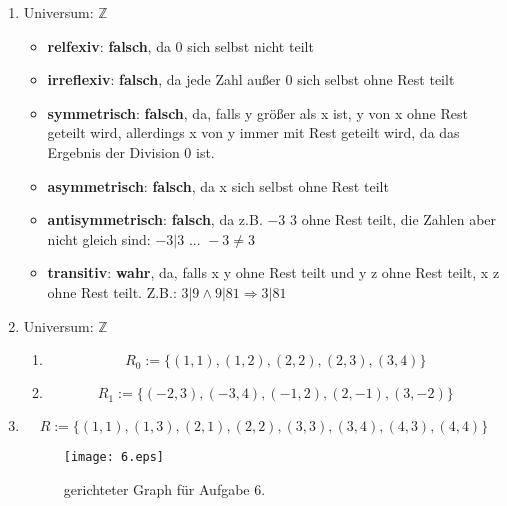 \documentclass[a4paper]{article}
\begin{document}
\begin{enumerate}
		\item
		Universum: $\mathbb{Z}$
		\begin{itemize}
			\item \textbf{relfexiv}: \textbf{falsch}, da 0 sich selbst nicht teilt
			\item \textbf{irreflexiv}: \textbf{falsch}, da jede Zahl außer 0 sich selbst ohne Rest teilt
			\item \textbf{symmetrisch}: \textbf{falsch}, da, falls y größer als x ist, y von x ohne Rest geteilt wird, allerdings x von y immer mit Rest geteilt wird, da das Ergebnis der Division 0 ist.
			\item \textbf{asymmetrisch}: \textbf{falsch}, da x sich selbst ohne Rest teilt
			\item \textbf{antisymmetrisch}: \textbf{falsch}, da z.B. $-3$ 3 ohne Rest teilt, die Zahlen aber nicht gleich sind: $-3 | 3 \text{ ... } -3 \neq 3$
			\item \textbf{transitiv}: \textbf{wahr}, da, falls x y ohne Rest teilt und y z ohne Rest teilt, x z ohne Rest teilt. Z.B.: $3 | 9 \land 9 | 81 \Rightarrow 3 | 81$
		\end{itemize}
		
		\item
		Universum: $\mathbb{Z}$
		\begin{enumerate}
			\item
			\begin{equation*}
				R_{0} := \{(1, 1), (1, 2), (2, 2), (2, 3), (3, 4)\}
			\end{equation*}
			
			\item
			\begin{equation*}
				R_{1} := \{(-2, 3), (-3, 4), (-1, 2), (2, -1), (3, -2)\}
			\end{equation*}
		\end{enumerate}
		
		\item
		\begin{equation*}
			R := \{(1, 1), (1, 3), (2, 1), (2, 2), (3, 3), (3, 4), (4, 3), (4, 4)\}
		\end{equation*}	
		
		\begin{figure}[ht!]
			\begin{center}
				\texttt{[image: 6.eps]}
				\caption{gerichteter Graph für Aufgabe 6.}
			\end{center}
		\end{figure}
		
	\end{enumerate}
\end{document}

